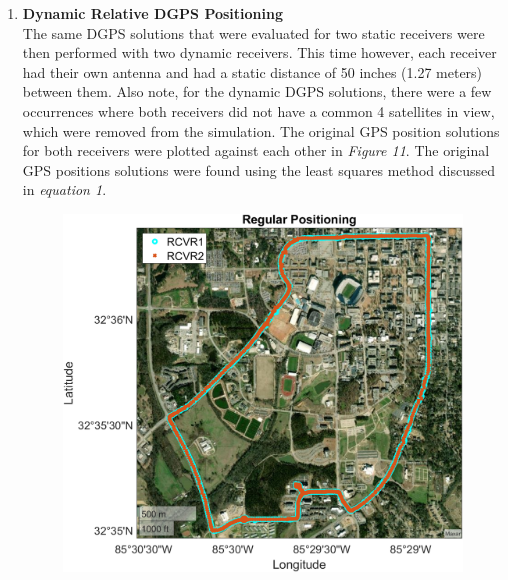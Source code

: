 \documentclass[11pt]{article}
\begin{document}
\begin{enumerate}[label=\textbf{\arabic*.}]
    \item \textbf{Dynamic Relative DGPS Positioning} \\
      The same DGPS solutions that were evaluated for two static receivers were then 
      performed with two dynamic receivers. This time however, each receiver had their own 
      antenna and had a static distance of 50 inches (1.27 meters) between them. Also note, 
      for the dynamic DGPS solutions, there were a few occurrences where both receivers did 
      not have a common 4 satellites in view, which were removed from the simulation. The 
      original GPS position solutions for both receivers were plotted against each other in 
      \emph{Figure 11}. The original GPS positions solutions were found using the least 
      squares method discussed in \emph{equation 1}. 
      \begin{figure}[H]
        \centering
        \begin{minipage}[b]{0.49\textwidth}
          \includegraphics[width=\textwidth]{p3_a.png}
        \end{minipage}
        \begin{minipage}[b]{0.49\textwidth}

\end{minipage}
\end{figure}
\end{enumerate}
\end{document}
